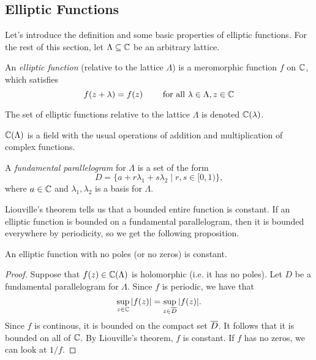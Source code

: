 \subsection{Elliptic Functions}

Let's introduce the definition and some basic properties of elliptic functions.
For the rest of this section,
let $\Lambda \subseteq \mathbb{C}$ be an arbitrary lattice.

\begin{definition}
	An \emph{elliptic function} (relative to the lattice $\Lambda$)
	is a meromorphic function
	$f$ on $\mathbb{C}$, which satisfies
	\begin{equation*}
		f(z + \lambda) = f(z)\qquad\textrm{ for all } \lambda \in \Lambda, z \in \mathbb{C}
	\end{equation*}
\end{definition}

\begin{notation}
	The set of elliptic functions relative to the lattice $\Lambda$ is denoted
	$\mathbb{C}(\lambda)$.
\end{notation}

\begin{remark}
	$\mathbb{C}(\Lambda)$ is a field with the usual operations of 
	addition and multiplication of complex functions.
\end{remark}

\begin{definition}
	A \emph{fundamental parallelogram} for $\Lambda$ is a set of the form
	\begin{equation*}
		D = \{a + r \lambda_1 + s \lambda_2 \mid r, s \in [0, 1)\},
	\end{equation*}
	where $a \in \mathbb{C}$ and $\lambda_1, \lambda_2$ is a basis for $\Lambda$.
\end{definition}

Liouville's theorem tells us that a bounded entire function is constant.
If an elliptic function is bounded on a fundamental parallelogram, then
it is bounded everywhere by periodicity, so we get the following proposition.

\begin{proposition}
	\label{prop:no-poles}
	An elliptic function with no poles (or no zeros) is constant.
\end{proposition}

\begin{proof}
	Suppose that $f(z)\in \mathbb{C}(\Lambda)$ is holomorphic (i.e. it has no poles).
	Let $D$ be a fundamental
	parallelogram for $\Lambda$. Since $f$ is periodic, we have that
	\begin{equation*}
		\sup_{z \in \mathbb{C}}|f(z)| = \sup_{z \in \overline{D}}|f(z)|.
	\end{equation*}
	Since $f$ is continous, it is bounded on the compact set $\overline{D}$.
	It follows that it is bounded on all of $\mathbb{C}$.
	By Liouville's theorem, $f$ is constant.
	If $f$ has no zeros, we can look at $1/f$.
\end{proof}

